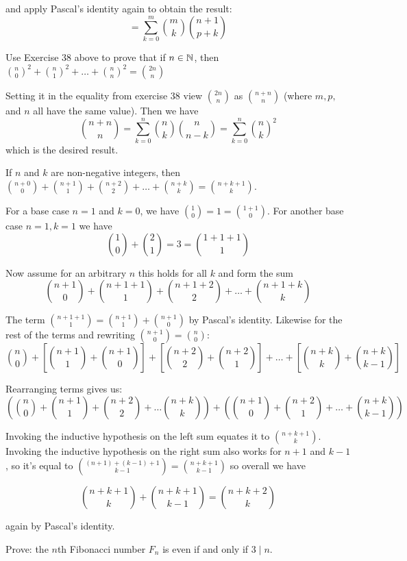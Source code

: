 \documentclass{article}
\begin{document}
and apply Pascal's identity again to obtain the result:
$$=\sum_{k=0}^{m}\binom{m}{k}\binom{n+1}{p+k}$$

\begin{problem}
Use Exercise 38 above to prove that if $n \in \mathbb{N}$, then $\binom{n}{0}^2 + \binom{n}{1}^2 + \ldots + \binom{n}{n}^2 = \binom{2n}{n}$
\end{problem}

Setting it in the equality from exercise 38 view $\binom{2n}{n}$ as $\binom{n + n}{n}$ (where $m, p,$ and $n$ all have the same value). Then we have
$$\binom{n + n}{n} = \sum_{k=0}^{n}\binom{n}{k}\binom{n}{n-k} = \sum_{k=0}^{n}\binom{n}{k}^2$$
which is the desired result.

\begin{problem}
If $n$ and $k$ are non-negative integers, then $\binom{n+0}{0} + \binom{n+1}{1}+\binom{n+2}{2}+\ldots + \binom{n+k}{k} = \binom{n + k + 1}{k}$.
\end{problem}

For a base case $n = 1$ and $k = 0$, we have $\binom{1}{0} = 1 = \binom{1 + 1}{0}$. For another base case $n = 1, k = 1$ we have
$$\binom{1}{0} + \binom{2}{1} = 3 = \binom{1+1+1}{1}$$

Now assume for an arbitrary $n$ this holds for all $k$ and form the sum
$$\binom{n+1}{0} + \binom{n + 1 + 1}{1} + \binom{n + 1 + 2}{2} + \ldots + \binom{n + 1 + k}{k}$$

The term $\binom{n + 1 + 1}{1} = \binom{n + 1}{1} + \binom{n + 1}{0}$ by Pascal's identity. Likewise for the rest of the terms and rewriting $\binom{n+1}{0} = \binom{n}{0}$:
$$\binom{n}{0} + \left[\binom{n+1}{1} + \binom{n+1}{0}\right] + \left[\binom{n+2}{2} + \binom{n+2}{1}\right] + \ldots + \left[\binom{n+k}{k} + \binom{n+k}{k-1}\right]$$

Rearranging terms gives us:
$$\left(\binom{n}{0} + \binom{n+1}{1} + \binom{n+2}{2} + \ldots \binom{n+k}{k}\right) + \left(\binom{n+1}{0} + \binom{n+2}{1} + \ldots + \binom{n+k}{k-1}\right)$$

Invoking the inductive hypothesis on the left sum equates it to $\binom{n+k+1}{k}$. Invoking the inductive hypothesis on the right sum also works for $n + 1$ and $k-1$, so it's equal to $\binom{(n + 1) + (k - 1) + 1}{k - 1} = \binom{n+k + 1}{k-1}$ so overall we have

$$\binom{n+k+1}{k} + \binom{n+k+1}{k-1} = \binom{n+k+2}{k}$$

again by Pascal's identity.

\begin{problem}
Prove: the $n$th Fibonacci number $F_n$ is even if and only if $3 \mid n$.
\end{problem}
\end{document}
